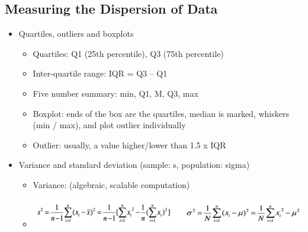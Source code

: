 \documentclass[11pt]{article}
\theoremstyle{definition}
\begin{document}
\subsection{Measuring the Dispersion of Data}
\begin{itemize}
    \item Quartiles, outliers and boxplots
    \begin{itemize}
        \item Quartiles: Q1 (25th percentile), Q3 (75th percentile)
        \item Inter-quartile range: IQR = Q3 – Q1
        \item Five number summary: min, Q1, M, Q3, max
        \item Boxplot: ends of the box are the quartiles, median is marked, whiskers (min / max),
        and plot outlier individually
        \item Outlier: usually, a value higher/lower than 1.5 x IQR
    \end{itemize}
    \item Variance and standard deviation (sample: s, population: sigma)
    \begin{itemize}
        \item Variance: (algebraic, scalable computation)
        \item \includegraphics[width=\textwidth]{7.png}
    \end{itemize}
\end{itemize}
\end{document}
